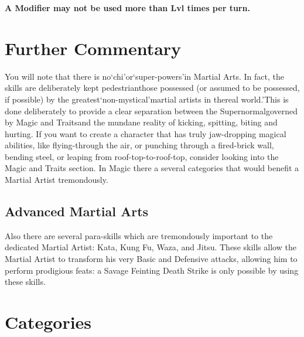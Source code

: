 \documentclass[twoside]{book}
\begin{document}
 \textbf{A Modifier may not be used more than Lvl times per turn.}


  

  

  
    

\section{Further Commentary}
    
    {  
    You will note that there is no`chi'or`super-powers'in Martial Arts. In fact, the skills are deliberately kept pedestrianthose possessed (or assumed to be possessed, if possible) by the greatest`non-mystical'martial artists in thereal world.'This is done deliberately to provide a clear separation between the Supernormalgoverned by Magic and Traitsand the mundane reality of kicking, spitting, biting and hurting. If you want to create a character that has truly jaw-dropping magical abilities, like flying-through the air, or punching through a fired-brick wall, bending steel, or leaping from roof-top-to-roof-top, consider looking into the Magic and Traits section. In Magic there a several categories that would benefit a Martial Artist tremondously.
    }
  
    

\subsection{Advanced Martial Arts}
    
    {  
    Also there are several para-skills which are tremondously important to the dedicated Martial Artist: Kata, Kung Fu, Waza, and Jitsu. These skills allow the Martial Artist to transform his very Basic and Defensive attacks, allowing him to perform prodigious feats: a Savage Feinting Death Strike is only possible by using these skills.
    }
  
    

\section{Categories}
    
\end{document}
